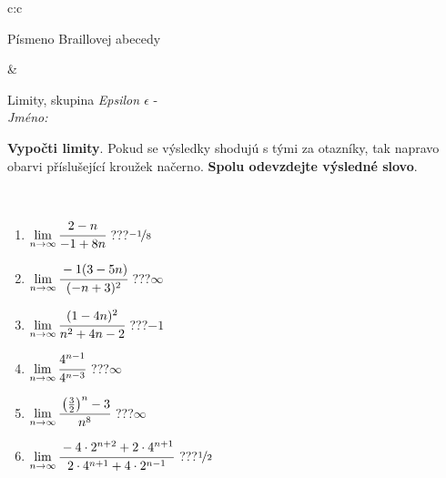 \documentclass[10pt]{report}
\begin{document}
\begin{tabular}{c:c}
\begin{minipage}[c][104.5mm][t]{0.5\linewidth}
\begin{center}
\begin{minipage}{0.20\linewidth}
\begin{center}
{\small Písmeno Braillovej abecedy}
\end{center}
\end{minipage}
\end{center}
\end{minipage}
&
\begin{minipage}[c][104.5mm][t]{0.5\linewidth}
\begin{center}
\vspace{7mm}
{\huge Limity, skupina \textit{Epsilon $\epsilon$} -}\\[5mm]
\textit{Jméno:}\phantom{xxxxxxxxxxxxxxxxxxxxxxxxxxxxxxxxxxxxxxxxxxxxxxxxxxxxxxxxxxxxxxxxx}\\[5mm]
\begin{minipage}{0.95\linewidth}
\begin{center}
\textbf{Vypočti limity}. Pokud se výsledky shodujú s tými za otazníky, tak napravo\\obarvi příslušející kroužek načerno. \textbf{Spolu odevzdejte výsledné slovo}.
\end{center}
\end{minipage}
\\[1mm]
\begin{minipage}{0.79\linewidth}
\begin{center}
\begin{varwidth}{\linewidth}
\begin{enumerate}
\normalsize
\item $\lim\limits_{n\to\infty}\cfrac{2-n}{-1+8n}$\quad \dotfill\; ???\;\dotfill \quad $\nicefrac{-1}{8}$
\item $\lim\limits_{n\to\infty}\cfrac{-1(3-5n)}{(-n+3)^2}$\quad \dotfill\; ???\;\dotfill \quad $\infty$
\item $\lim\limits_{n\to\infty}\cfrac{(1-4n)^2}{n^2+4n-2}$\quad \dotfill\; ???\;\dotfill \quad $-1$
\item $\lim\limits_{n\to\infty}\cfrac{4^{n-1}}{4^{n-3}}$\quad \dotfill\; ???\;\dotfill \quad $\infty$
\item $\lim\limits_{n\to\infty}\cfrac{\left(\frac{3}{2}\right)^n -3}{n^{8}}$\quad \dotfill\; ???\;\dotfill \quad $\infty$
\item $\lim\limits_{n\to\infty}\cfrac{-4\cdot 2^{n+2}+2\cdot 4^{n+1}}{2\cdot 4^{n+1}+4\cdot 2^{n-1}}$\quad \dotfill\; ???\;\dotfill \quad $\nicefrac{1}{2}$
\end{enumerate}
\end{varwidth}
\end{center}
\end{minipage}

\end{center}
\end{minipage}
\end{tabular}
\end{document}
